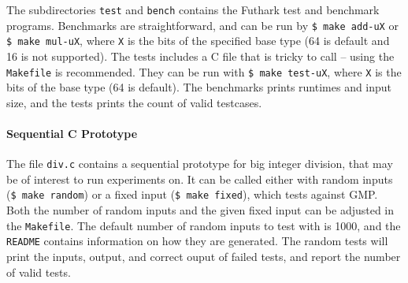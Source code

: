 The subdirectories \texttt{test} and \texttt{bench} contains the Futhark test
and benchmark programs. Benchmarks are straightforward, and can be run by
\texttt{\$ make add-uX} or \texttt{\$ make mul-uX}, where \texttt{X} is the bits
of the specified base type (64 is default and 16 is not supported).  The tests
includes a C file that is tricky to call -- using the \texttt{Makefile} is
recommended. They can be run with \texttt{\$ make test-uX}, where \texttt{X} is
the bits of the base type (64 is default). The benchmarks prints runtimes and
input size, and the tests prints the count of valid testcases.

\paragraph{Sequential C Prototype}
The file \texttt{div.c} contains a sequential prototype for big integer
division, that may be of interest to run experiments on. It can be called either
with random inputs (\texttt{\$ make random}) or a fixed input (\texttt{\$ make
  fixed}), which tests against GMP. Both the number of random inputs and the
given fixed input can be adjusted in the \texttt{Makefile}. The default number
of random inputs to test with is 1000, and the \texttt{README} contains
information on how they are generated. The random tests will print the inputs,
output, and correct ouput of failed tests, and report the number of valid tests.

